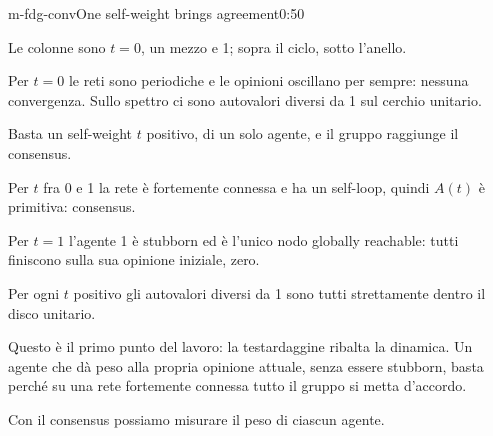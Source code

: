 \begin{slide}{m-fdg-conv}{One self-weight brings agreement}{0:50}
  \begin{discorso}
    \item Le colonne sono $t=0$, un mezzo e 1; sopra il ciclo, sotto l'anello.
    \item Per $t=0$ le reti sono periodiche e le opinioni oscillano per sempre: nessuna {\color{red}  } {\color{blue}convergenza.} Sullo spettro ci sono autovalori diversi da 1 sul cerchio unitario.
    \item Basta un self-weight $t$ positivo, di un solo agente, e il gruppo raggiunge il {\color{red}} {\color{blue}consensus.}
    \item Per $t$ fra 0 e 1 la rete è fortemente connessa {\color{red}} {\color{blue}e ha} un self-loop, quindi $A(t)$ è {\color{red}      } {\color{blue}primitiva: consensus.}
    \item Per $t=1$ l'agente 1 è stubborn ed è l'unico nodo globally reachable: tutti finiscono sulla sua opinione iniziale, zero. {\color{red} }
    \item Per ogni $t$ positivo gli autovalori diversi da 1 sono tutti strettamente dentro il disco unitario.
    \item Questo è il primo punto del lavoro: la testardaggine ribalta la dinamica. Un agente che dà peso alla propria opinione attuale, senza essere stubborn, basta perché su una rete fortemente connessa tutto il gruppo si metta d'accordo.
    \item Con il {\color{red}} {\color{blue}consensus} possiamo misurare il peso di ciascun agente.
  \end{discorso}
\end{slide}

